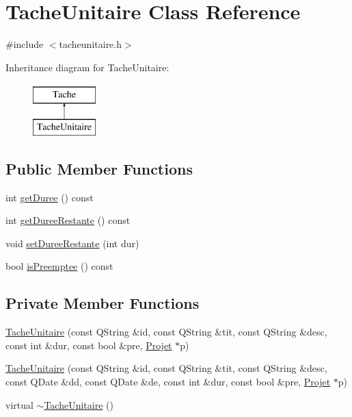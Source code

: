 \hypertarget{class_tache_unitaire}{}\section{Tache\+Unitaire Class Reference}
\label{class_tache_unitaire}


{\ttfamily \#include $<$tacheunitaire.\+h$>$}

Inheritance diagram for Tache\+Unitaire\+:\begin{figure}[H]
\begin{center}
\leavevmode
\includegraphics[height=2.000000cm]{class_tache_unitaire}
\end{center}
\end{figure}
\subsection*{Public Member Functions}
\begin{DoxyCompactItemize}
\item 
int \hyperlink{class_tache_unitaire_a2f1c93887c652e5581df4357bc72949b}{get\+Duree} () const 
\item 
int \hyperlink{class_tache_unitaire_aa9b7e58e61dfded16d5a2508d33734c5}{get\+Duree\+Restante} () const 
\item 
void \hyperlink{class_tache_unitaire_a5b1dc4cb5b374fce9c26abb4c954cef8}{set\+Duree\+Restante} (int dur)
\item 
bool \hyperlink{class_tache_unitaire_a4a25bc2f0b3e6ebd6c0617d22328c986}{is\+Preemptee} () const 
\end{DoxyCompactItemize}
\subsection*{Private Member Functions}
\begin{DoxyCompactItemize}
\item 
\hyperlink{class_tache_unitaire_acca628b1c239bf191fbbf869ad15cdd2}{Tache\+Unitaire} (const Q\+String \&id, const Q\+String \&tit, const Q\+String \&desc, const int \&dur, const bool \&pre, \hyperlink{class_projet}{Projet} $\ast$p)
\item 
\hyperlink{class_tache_unitaire_ab97fdcb6d8d43ff76d46a7ae650eba3d}{Tache\+Unitaire} (const Q\+String \&id, const Q\+String \&tit, const Q\+String \&desc, const Q\+Date \&dd, const Q\+Date \&de, const int \&dur, const bool \&pre, \hyperlink{class_projet}{Projet} $\ast$p)
\item 
virtual \hyperlink{class_tache_unitaire_a54c9937fb3088c48348883ad1b385f8c}{$\sim$\+Tache\+Unitaire} ()
\end{DoxyCompactItemize}
